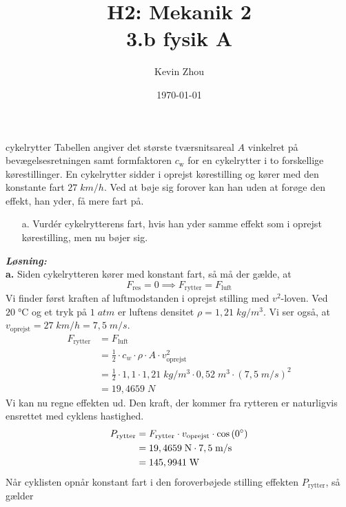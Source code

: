 \documentclass{report}
\title{H2: Mekanik 2\\
{\Large \textbf{3.b fysik A}}}
\author{Kevin Zhou}
\date{\today}
\newcommand{\sol}{\setlength{\parindent}{0cm}\textbf{\textit{Løsning:}}\setlength{\parindent}{1cm}}
\begin{document}
\maketitle
\begin{question}{cykelrytter}{}
  Tabellen angiver det største tværsnitsareal $A$ vinkelret på bevægelsesretningen samt formfaktoren $c_\mathrm{w}$ for en cykelrytter i to forskellige kørestillinger.
  En cykelrytter sidder i oprejst kørestilling og kører med den konstante fart $27 \;\unit{km/h}$. Ved at bøje sig forover kan han uden at forøge den effekt, han yder, få mere fart på.
  \begin{itemize}
    \item[a.] Vurdér cykelrytterens fart, hvis han yder samme effekt som i oprejst kørestilling, men nu bøjer sig.
  \end{itemize}
\end{question}
\sol \\
\textbf{a.}
Siden cykelrytteren kører med konstant fart, så må der gælde, at 
\[
F _{\text{res}}=0 \implies F _{\text{rytter} }=F _{\text{luft} }
\]
Vi finder først kraften af luftmodstanden i oprejst stilling med $v^2$-loven.
Ved $20 \;\unit{\celsius}$ og et tryk på $1 \;\unit{atm} $ er luftens densitet $\rho=1,21 \;\unit{kg/m^3} $.
Vi ser også, at $v_{\text{oprejst}}=27 \;\unit{km/h} = 7,5 \;\unit{m/s}$.
\begin{equation*}
\begin{split}
  F_{\text{rytter}}&=F_{\text{luft}}\\
  &=\frac{1}{2}\cdot c_w \cdot \rho \cdot A \cdot v_{\text{oprejst}}^2\\
  &=\frac{1}{2} \cdot 1,1 \cdot 1,21 \;\unit{kg/m^3} \cdot 0,52 \;\unit{m^3} \cdot \left(7,5 \;\unit{m/s}\right)^2\\
  &=19,4659 \;\unit{N} 
\end{split}
\end{equation*}
Vi kan nu regne effekten ud.
Den kraft, der kommer fra rytteren er naturligvis ensrettet med cyklens hastighed.
\begin{equation*}
\begin{split}
  P_{\text{rytter} }&=F _{\text{rytter} } \cdot v_{\text{oprejst}} \cdot \cos\left(0 \degree \right) \\
  &=19,4659 \;\unit{N} \cdot 7,5 \;\unit{m/s}\\
  &=145,9941 \;\unit{W} 
\end{split}
\end{equation*}
Når cyklisten opnår konstant fart i den foroverbøjede stilling effekten $P_{\text{rytter} }$, så gælder
\end{document}
